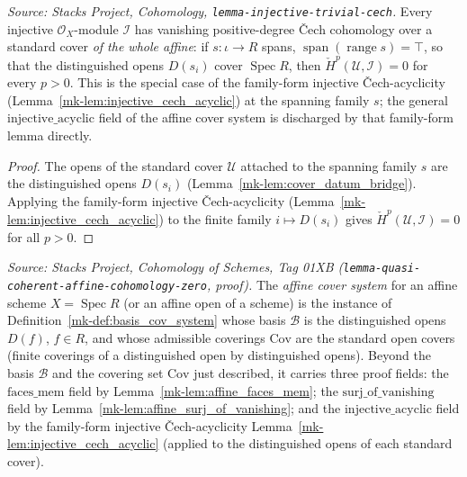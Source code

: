 \begin{lemma}\label{mk-lem:affine_injective_acyclic}
  \leanok

  \textit{Source: Stacks Project, Cohomology, \texttt{lemma-injective-trivial-cech}.}
  Every injective \(\mathcal{O}_X\)-module \(\mathcal{I}\) has vanishing positive-degree {\v C}ech
  cohomology over a standard cover \emph{of the whole affine}: if
  \(s : \iota \to R\) spans, \(\operatorname{span}(\operatorname{range} s) = \top\), so that the
  distinguished opens \(D(s_i)\) cover \(\operatorname{Spec} R\), then
  \(\check{H}^p(\mathcal{U}, \mathcal{I}) = 0\) for every \(p > 0\). This is the special case of the
  family-form injective {\v C}ech-acyclicity (Lemma~\ref{mk-lem:injective_cech_acyclic}) at the
  spanning family \(s\); the general \(\mathrm{injective\_acyclic}\) field of the affine cover system
  is discharged by that family-form lemma directly.
\end{lemma}
\begin{proof}
  \leanok
  The opens of the standard cover \(\mathcal{U}\) attached to the spanning family \(s\) are the
  distinguished opens \(D(s_i)\) (Lemma~\ref{mk-lem:cover_datum_bridge}). Applying the family-form
  injective {\v C}ech-acyclicity (Lemma~\ref{mk-lem:injective_cech_acyclic}) to the finite family
  \(i \mapsto D(s_i)\) gives \(\check{H}^p(\mathcal{U}, \mathcal{I}) = 0\) for all \(p > 0\).
\end{proof}

\begin{definition}\label{mk-def:affine_cover_system}
  \leanok

  \textit{Source: Stacks Project, Cohomology of Schemes, Tag 01XB
  (\texttt{lemma-quasi-coherent-affine-cohomology-zero}, proof).}
  The \emph{affine cover system} for an affine scheme \(X = \operatorname{Spec} R\) (or an affine open
  of a scheme) is the instance of Definition~\ref{mk-def:basis_cov_system} whose basis \(\mathcal{B}\) is
  the distinguished opens \(D(f)\), \(f \in R\), and whose admissible coverings \(\mathrm{Cov}\) are
  the standard open covers (finite coverings of a distinguished open by distinguished opens). Beyond
  the basis \(\mathcal{B}\) and the covering set \(\mathrm{Cov}\) just described, it carries three
  proof fields: the \(\mathrm{faces\_mem}\) field by Lemma~\ref{mk-lem:affine_faces_mem}; the
  \(\mathrm{surj\_of\_vanishing}\) field by Lemma~\ref{mk-lem:affine_surj_of_vanishing}; and the
  \(\mathrm{injective\_acyclic}\) field by the family-form injective {\v C}ech-acyclicity
  Lemma~\ref{mk-lem:injective_cech_acyclic} (applied to the distinguished opens of each standard cover).
\end{definition}

